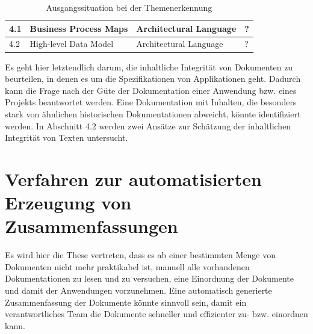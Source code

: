 \begin{table}[h]
\begin{tabular}{|l|l|l|l|}
4.1              & Business Process Maps                                                                 & Architectural Language    & ?                         \\ \hline
4.2              & High-level Data Model                                                                 & Architectural Language    & ?                         \\ \hline
\end{tabular}

\caption{Ausgangssituation bei der Themenerkennung}
\label{tab:themenerkennung}

\end{table}

Es geht hier letztendlich darum, die inhaltliche Integrität von Dokumenten zu beurteilen, in denen es um die Spezifikationen von Applikationen geht. Dadurch kann die Frage nach der Güte der Dokumentation einer Anwendung bzw. eines Projekts beantwortet werden. Eine Dokumentation mit Inhalten, die besonders stark von ähnlichen historischen Dokumentationen abweicht, könnte identifiziert werden. In Abschnitt 4.2 werden zwei Ansätze zur Schätzung der inhaltlichen Integrität von Texten untersucht.

\section{Verfahren zur automatisierten Erzeugung von Zusammenfassungen}

Es wird hier die These vertreten, dass es ab einer bestimmten Menge von Dokumenten nicht mehr praktikabel ist, manuell alle vorhandenen Dokumentationen zu lesen und zu versuchen, eine Einordnung der Dokumente und damit der Anwendungen vorzunehmen. Eine automatisch generierte Zusammenfassung der Dokumente könnte sinnvoll sein, damit ein verantwortliches Team die Dokumente schneller und effizienter zu- bzw. einordnen kann.

